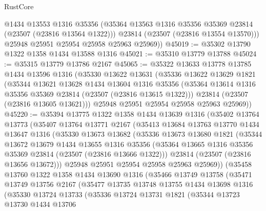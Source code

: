 \begin{lexlean}{RustCore}
\begin{coremodule}
          @1434
          @13553
          @1316
          @35356
          (@35364 @13563 @1316 @35356 @35369 @23814 (@23507 (@23816 @13564 @1322)))
          @23814
          (@23507 (@23816 @13554 @13570)))
        @25948
        @25951
        @25954
        @25958
        @25963
        @25969))
@45019 := @35302 @13790 @1322 @1358 @1434 @13588 @1316
@45021 := @35310 @13779 @13788
@45024 := @35315 @13779 @13786 @2167
@45065 := @35322
    @13633
    @13778
    @13785
    @1434
    @13596
    @1316
    (@35330
      @13622
      @13631
      (@35336
        @13622
        @13629
        @1821
        (@35344
          @13621
          @13628
          @1434
          @13604
          @1316
          @35356
          (@35364 @13614 @1316 @35356 @35369 @23814 (@23507 (@23816 @13615 @1322)))
          @23814
          (@23507 (@23816 @13605 @13621)))
        @25948
        @25951
        @25954
        @25958
        @25963
        @25969))
@45220 := @35394
    @13775
    @1322
    @1358
    @1434
    @13639
    @1316
    (@35402
      @13764
      @13773
      (@35407
        @13764
        @13771
        @2167
        (@35413
          @13684
          @13763
          @13770
          @1434
          @13647
          @1316
          (@35330
            @13673
            @13682
            (@35336
              @13673
              @13680
              @1821
              (@35344
                @13672
                @13679
                @1434
                @13655
                @1316
                @35356
                (@35364 @13665 @1316 @35356 @35369 @23814 (@23507 (@23816 @13666 @1322)))
                @23814
                (@23507 (@23816 @13656 @13672)))
              @25948
              @25951
              @25954
              @25958
              @25963
              @25969))
          (@35458
            @13760
            @1322
            @1358
            @1434
            @13690
            @1316
            (@35466
              @13749
              @13758
              (@35471
                @13749
                @13756
                @2167
                (@35477
                  @13735
                  @13748
                  @13755
                  @1434
                  @13698
                  @1316
                  (@35330
                    @13724
                    @13733
                    (@35336
                      @13724
                      @13731
                      @1821
                      (@35344
                        @13723
                        @13730
                        @1434
                        @13706

\end{coremodule}
\end{lexlean}
